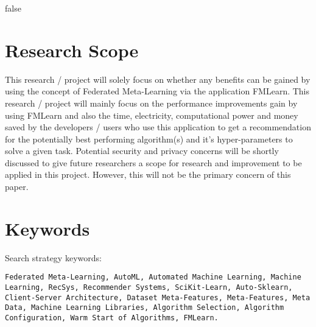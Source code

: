 \if false

\section{Research Scope}
This research / project will solely focus on whether any benefits can be gained by using the concept of Federated Meta-Learning via the application FMLearn. This research / project will mainly focus on the performance improvements gain by using FMLearn and also the time, electricity, computational power and money saved by the developers / users who use this application to get a recommendation for the potentially best performing algorithm(s) and it's hyper-parameters to solve a given task. Potential security and privacy concerns will be shortly discussed to give future researchers a scope for research and improvement to be applied in this project. However, this will not be the primary concern of this paper.

\section{Keywords}
Search strategy keywords:

\texttt{Federated Meta-Learning, AutoML, Automated Machine Learning, Machine Learning, RecSys, Recommender Systems, SciKit-Learn, Auto-Sklearn, Client-Server Architecture, Dataset Meta-Features, Meta-Features, Meta Data, Machine Learning Libraries, Algorithm Selection, Algorithm Configuration, Warm Start of Algorithms, FMLearn.}

\fi